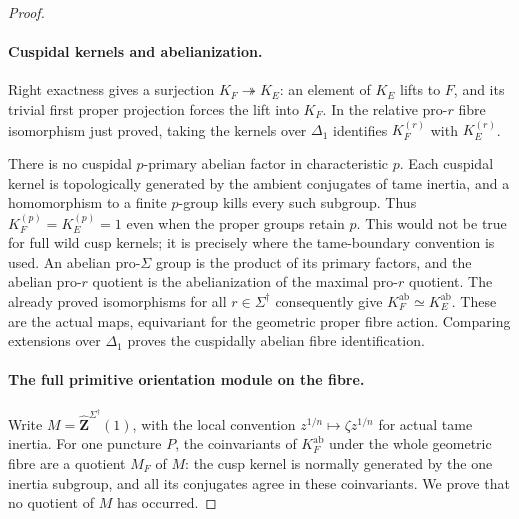 \begin{proof}
\paragraph{Cuspidal kernels and abelianization.}
Right exactness gives a surjection $K_F\twoheadrightarrow K_E$:
an element of $K_E$ lifts to $F$, and its trivial first proper
projection forces the lift into $K_F$. In the relative pro-$r$
fibre isomorphism just proved, taking the kernels over $\Delta_1$
identifies $K_F^{(r)}$ with $K_E^{(r)}$.

There is no cuspidal $p$-primary abelian factor in characteristic
$p$. Each cuspidal kernel is topologically generated by the
ambient conjugates of tame inertia, and a homomorphism to a
finite $p$-group kills every such subgroup. Thus
$K_F^{(p)}=K_E^{(p)}=1$ even when the proper groups retain $p$.
This would not be true for full wild cusp kernels; it is precisely
where the tame-boundary convention is used. An abelian pro-$\Sigma$
group is the product of its primary factors, and the abelian
pro-$r$ quotient is the abelianization of the maximal pro-$r$
quotient. The already proved isomorphisms for all
$r\in\Sigma^\dagger$ consequently give
$K_F^{\mathrm{ab}}\simeq K_E^{\mathrm{ab}}$.
These are the actual maps, equivariant for the geometric proper
fibre action. Comparing extensions over $\Delta_1$ proves the
cuspidally abelian fibre identification.

\paragraph{The full primitive orientation module on the fibre.}
Write $M=\widehat{\mathbf Z}^{\Sigma^\dagger}(1)$, with the local
convention $z^{1/n}\mapsto\zeta z^{1/n}$ for actual tame inertia.
For one puncture $P$, the coinvariants of $K_F^{\mathrm{ab}}$
under the whole geometric fibre are a quotient $M_F$ of $M$:
the cusp kernel is normally generated by the one inertia subgroup,
and all its conjugates agree in these coinvariants. We prove that
no quotient of $M$ has occurred.


\end{proof}

